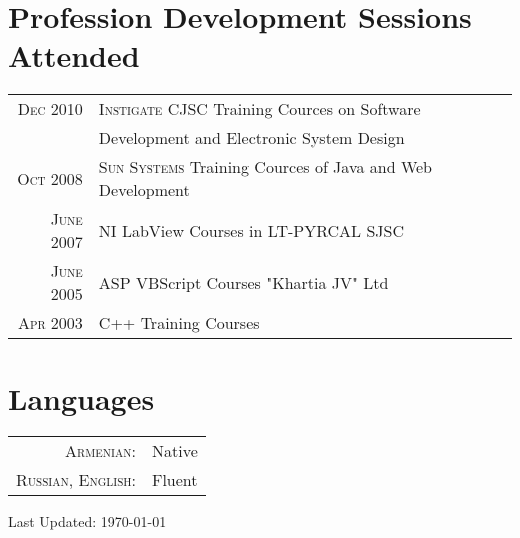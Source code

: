 \documentclass[a4paper,10pt]{article}
\begin{document}
\section{Profession Development Sessions Attended}
\begin{tabular}{rl}
  \textsc{Dec} 2010
    & \textsc{Instigate CJSC} Training Cources on Software \\
    & Development and Electronic System Design \\
  \textsc{Oct} 2008
    & \textsc{Sun Systems} Training Cources of Java and Web Development \\
  \textsc{June} 2007
    & NI LabView Courses in LT-PYRCAL SJSC \\
  \textsc{June} 2005
    & ASP VBScript Courses "Khartia JV" Ltd \\
  \textsc{Apr} 2003
    & C++ Training Courses
\end{tabular}


\section{Languages}
\begin{tabular}{rl}
  \textsc{Armenian:}         & Native \\
  \textsc{Russian, English:} & Fluent \\
\end{tabular}


\vfill
\hfill \footnotesize{Last Updated: \mydate\today }
\end{document}
